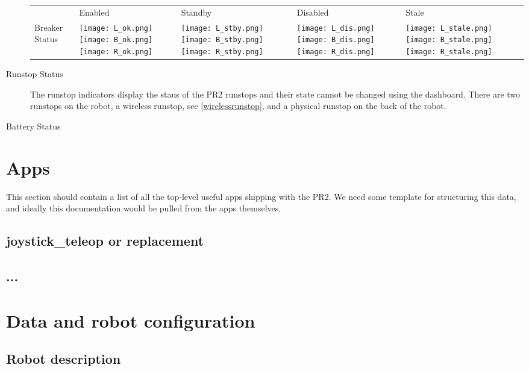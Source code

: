 \begin{description}
    \begin{tabular}{m{2.6cm}SSSS}
     & Enabled & Standby & Disabled & Stale\\
    Breaker Status & \texttt{[image: L\_ok.png]}\texttt{[image: B\_ok.png]}\texttt{[image: R\_ok.png]}&
                     \texttt{[image: L\_stby.png]}\texttt{[image: B\_stby.png]}\texttt{[image: R\_stby.png]}&
                     \texttt{[image: L\_dis.png]}\texttt{[image: B\_dis.png]}\texttt{[image: R\_dis.png]}&
                     \texttt{[image: L\_stale.png]}\texttt{[image: B\_stale.png]}\texttt{[image: R\_stale.png]}\\
   \end{tabular}



\item[Runstop Status] The runstop indicators display the staus of the PR2 runstops and their state cannot be changed using the dashboard. 
There are two runstops on the robot, a wireless runstop, see \ref{wirelessrunstop}, and a physical runstop on the back of the robot.

\item[Battery Status]

\end{description}

\section{Apps}
This section should contain a list of all the top-level useful apps shipping with the PR2.  We need some template for structuring this data, and ideally this documentation would be pulled from the apps themselves.

\subsection{joystick\_teleop or replacement}
\subsection{...}
\section{Data and robot configuration}
\subsection{Robot description}
